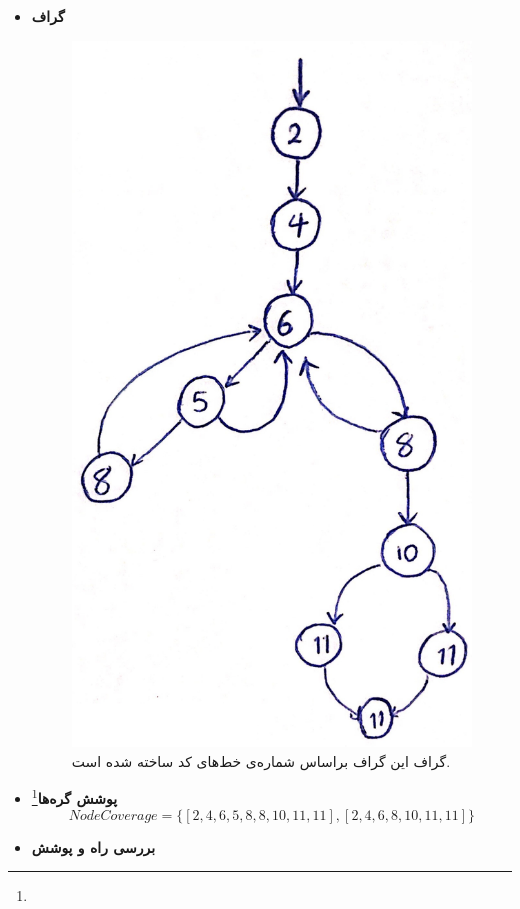 \begin{itemize}
	\item \textbf{گراف }
	\begin{figure}[!h]
		\begin{center}
			\includegraphics[scale=.5]{./9-2.jpg}
			\caption{گراف  این گراف براساس شماره‌ی خط‌های کد ساخته شده است.}
		\end{center}
	\end{figure}
	\item \textbf{پوشش گره‌ها}\footnote{}
	\begin{equation*}
	Node Coverage = \{[2, 4, 6, 5, 8, 8, 10, 11, 11], [2, 4, 6, 8, 10, 11, 11]\}
	\end{equation*}
	\item \textbf{بررسی راه و پوشش}
	

\end{itemize}
